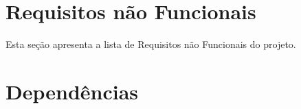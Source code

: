 \documentclass{article}
\begin{document}
\section{Requisitos não Funcionais}
Esta seção apresenta a lista de Requisitos não Funcionais do projeto.
		  
	
		  
\section{Dependências}
	
	  
	
% 
% 
		  
\end{document}

